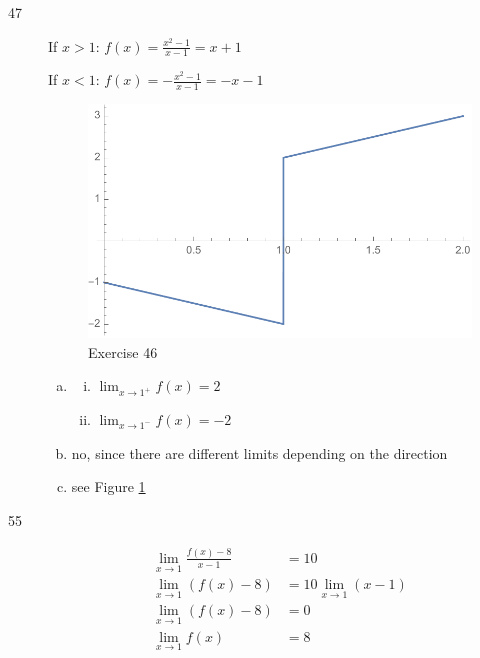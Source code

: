 \documentclass[letterpaper, landscape]{exam}
\begin{document}
\begin{description}
      \item[47]
        If $x > 1$: $f(x) = \frac{x^2 - 1}{x - 1} = x + 1$

        If $x < 1$: $f(x) = - \frac{x^2 - 1}{x - 1} = -x - 1$

        \begin{figure}[H]
          \centering
          \includegraphics[scale = 0.5]{ex46.pdf}
          \caption{Exercise 46}
          \label{fig:ex46}
        \end{figure}

        \begin{enumerate}[(a)]
          \item
            \begin{enumerate}[(i)]
              \item $\lim_{x \to 1^+} f(x) = \boxed{ 2 }$
              \item $\lim_{x \to 1^-} f(x) = \boxed{ -2 }$
            \end{enumerate}
          \item no, since there are different limits depending on the direction
          \item see Figure \ref{fig:ex46}
        \end{enumerate}

      \item[55]
        \begin{align*}
          \lim_{x \to 1} \frac{f(x) - 8}{x - 1} & = 10 \\
          \lim_{x \to 1} (f(x) - 8)             & = 10 \lim_{x \to 1} (x - 1) \\
          \lim_{x \to 1} (f(x) - 8)             & = 0 \\
          \lim_{x \to 1} f(x)                   & = \boxed{ 8 } \\
        \end{align*}


\end{description}
\end{document}
